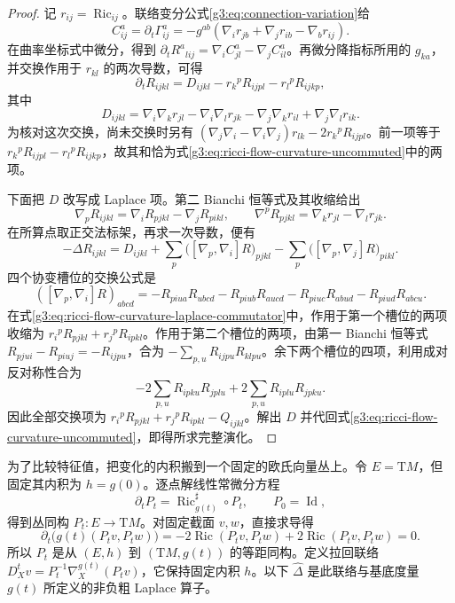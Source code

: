 \begin{proof}
	记 \(r_{ij}=\operatorname{Ric}_{ij}\)。联络变分公式\eqref{g3:eq:connection-variation}给
	\[
		C^a_{ij}=\partial_t\Gamma^a_{ij}
		=-g^{ab}(\nabla_i r_{jb}+\nabla_j r_{ib}-\nabla_b r_{ij}).
	\]
	在曲率坐标式中微分，得到
	\(\partial_tR^a{}_{l i j}=\nabla_i C^a_{jl}-\nabla_j C^a_{il}\)。再微分降指标所用的 \(g_{ka}\)，并交换作用于 \(r_{kl}\) 的两次导数，可得
	\begin{equation}\label{g3:eq:ricci-flow-curvature-uncommuted}
		\partial_tR_{ijkl}
		=D_{ijkl}-r_k{}^pR_{ijpl}-r_l{}^pR_{ijkp},
	\end{equation}
	其中
	\[
		D_{ijkl}=\nabla_i\nabla_k r_{jl}-\nabla_i\nabla_l r_{jk}
		-\nabla_j\nabla_k r_{il}+\nabla_j\nabla_l r_{ik}.
	\]
	为核对这次交换，尚未交换时另有
	\((\nabla_j\nabla_i-\nabla_i\nabla_j)r_{lk}-2r_k{}^pR_{ijpl}\)。前一项等于 \(r_k{}^pR_{ijpl}-r_l{}^pR_{ijkp}\)，故其和恰为式\eqref{g3:eq:ricci-flow-curvature-uncommuted}中的两项。

	下面把 \(D\) 改写成 Laplace 项。第二 Bianchi 恒等式及其收缩给出
	\[
		\nabla_pR_{ijkl}=\nabla_iR_{pjkl}-\nabla_jR_{pikl},
		\qquad \nabla^pR_{pjkl}=\nabla_k r_{jl}-\nabla_l r_{jk}.
	\]
	在所算点取正交法标架，再求一次导数，便有
	\begin{equation}\label{g3:eq:ricci-flow-curvature-laplace-commutator}
		-\Delta R_{ijkl}=D_{ijkl}
		+\sum_p\bigl([\nabla_p,\nabla_i]R\bigr)_{pjkl}
		-\sum_p\bigl([\nabla_p,\nabla_j]R\bigr)_{pikl}.
	\end{equation}
	四个协变槽位的交换公式是
	\[
		([\nabla_p,\nabla_i]R)_{abcd}
		=-R_{piua}R_{ubcd}-R_{piub}R_{aucd}
		-R_{piuc}R_{abud}-R_{piud}R_{abcu}.
	\]
	在式\eqref{g3:eq:ricci-flow-curvature-laplace-commutator}中，作用于第一个槽位的两项收缩为
	\(r_i{}^pR_{pjkl}+r_j{}^pR_{ipkl}\)。作用于第二个槽位的两项，由第一 Bianchi 恒等式
	\(R_{pjui}-R_{piuj}=-R_{ijpu}\)，合为
	\(-\sum_{p,u}R_{ijpu}R_{klpu}\)。余下两个槽位的四项，利用成对反对称性合为
	\[
		-2\sum_{p,u}R_{ipku}R_{jplu}
		+2\sum_{p,u}R_{iplu}R_{jpku}.
	\]
	因此全部交换项为 \(r_i{}^pR_{pjkl}+r_j{}^pR_{ipkl}-Q_{ijkl}\)。解出 \(D\) 并代回式\eqref{g3:eq:ricci-flow-curvature-uncommuted}，即得所求完整演化。
\end{proof}

为了比较特征值，把变化的内积搬到一个固定的欧氏向量丛上。令 \(E=\mathrm TM\)，但固定其内积为 \(h=g(0)\)。逐点解线性常微分方程
\begin{equation}\label{g3:eq:ricci-flow-orthonormal-bundle-ode}
	\partial_tP_t=\operatorname{Ric}_{g(t)}^\sharp\circ P_t,
	\qquad P_0=\operatorname{Id},
\end{equation}
得到丛同构 \(P_t:E\to\mathrm TM\)。对固定截面 \(v,w\)，直接求导得
\[
	\partial_t\bigl(g(t)(P_tv,P_tw)\bigr)
	=-2\operatorname{Ric}(P_tv,P_tw)
	+2\operatorname{Ric}(P_tv,P_tw)=0.
\]
所以 \(P_t\) 是从 \((E,h)\) 到 \((\mathrm TM,g(t))\) 的等距同构。定义拉回联络
\(D^t_Xv=P_t^{-1}\nabla^{g(t)}_X(P_tv)\)，它保持固定内积 \(h\)。以下 \(\widehat\Delta\) 是此联络与基底度量 \(g(t)\) 所定义的非负粗 Laplace 算子。

